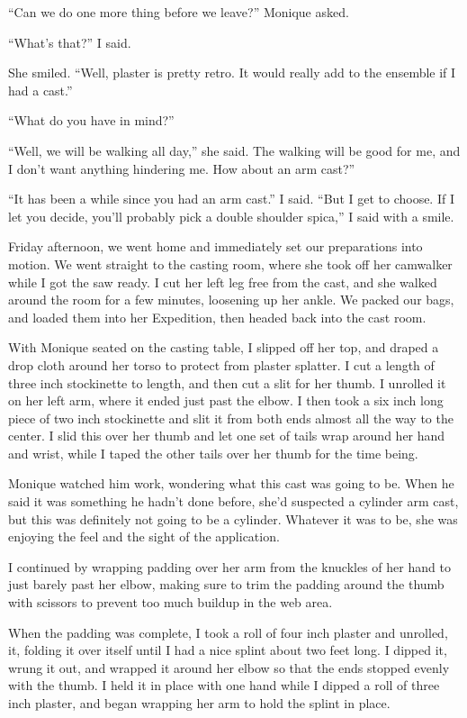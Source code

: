 ``Can we do one more thing before we leave?'' Monique asked.

``What's that?'' I said.

She smiled. ``Well, plaster is pretty retro. It would really add to the ensemble if I had a
cast.''

``What do you have in mind?''

``Well, we will be walking all day,'' she said. The walking will be good for me, and I don't
want anything hindering me. How about an arm cast?''

``It has been a while since you had an arm cast.'' I said. ``But I get to choose. If I let you
decide, you'll probably pick a double shoulder spica,'' I said with a smile.

Friday afternoon, we went home and immediately set our preparations into motion. We went
straight to the casting room, where she took off her camwalker while I got the saw ready. I cut
her left leg free from the cast, and she walked around the room for a few minutes, loosening up
her ankle. We packed our bags, and loaded them into her Expedition, then headed back into the
cast room.

With Monique seated on the casting table, I slipped off her top, and draped a drop cloth
around her torso to protect from plaster splatter. I cut a length of three inch stockinette to
length, and then cut a slit for her thumb. I unrolled it on her left arm, where it ended just
past the elbow. I then took a six inch long piece of two inch stockinette and slit it from both
ends almost all the way to the center. I slid this over her thumb and let one set of tails wrap
around her hand and wrist, while I taped the other tails over her thumb for the time being.

Monique watched him work, wondering what this cast was going to be. When he said it was
something he hadn't done before, she'd suspected a cylinder arm cast, but this was definitely
not going to be a cylinder. Whatever it was to be, she was enjoying the feel and the sight of
the application.

I continued by wrapping padding over her arm from the knuckles of her hand to just barely past
her elbow, making sure to trim the padding around the thumb with scissors to prevent too much
buildup in the web area.

When the padding was complete, I took a roll of four inch plaster and unrolled, it, folding it
over itself until I had a nice splint about two feet long. I dipped it, wrung it out, and
wrapped it around her elbow so that the ends stopped evenly with the thumb. I held it in place
with one hand while I dipped a roll of three inch plaster, and began wrapping her arm to hold
the splint in place.

